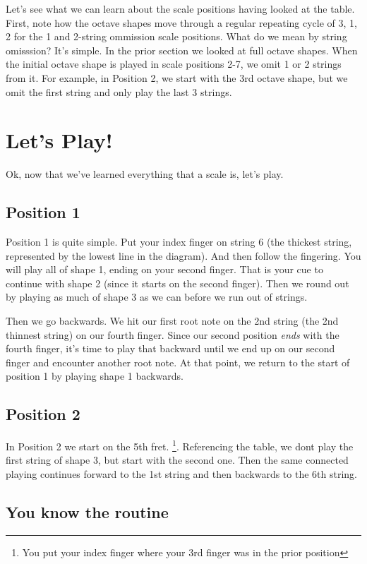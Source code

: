 \documentclass[12pt]{report}
\begin{document}
Let's see what we can learn about the scale positions having looked at
the table. First, note how the octave shapes move through a regular
repeating cycle of 3, 1, 2 for the 1 and 2-string ommission scale
positions. What do we mean by string omisssion? It's simple. In the
prior section we looked at full octave shapes. When the initial octave
shape is played in scale positions 2-7, we omit 1 or 2 strings from
it. For example, in Position 2, we start with the 3rd octave shape,
but we omit the first string and only play the last 3 strings. 

\section{Let's Play!}

Ok, now that we've learned everything that a scale is, let's play.

\subsection{Position 1}

Position 1 is quite simple. Put your index finger on string 6 (the
thickest string, represented by the lowest line in the diagram). And
then follow the fingering. You will play all of shape 1, ending on
your second finger. That is your cue to continue with shape 2 (since
it starts on the second finger). Then we round out by playing as much
of shape 3 as we can before we run out of strings.

Then we go backwards. We hit our first root note on the 2nd string
(the 2nd thinnest string) on our fourth finger. Since our second
position \emph{ends} with the fourth finger, it's time to play that
backward until we end up on our second finger and encounter another
root note. At that point, we return to the start of position 1 by
playing shape 1 backwards.

\subsection {Position 2}

In Position 2 we start on the 5th fret. \footnote{You put your index
  finger where your 3rd finger was in the prior position}. Referencing
the table, we dont play the first string of shape 3, but start with
the second one. Then the same connected playing continues forward to
the 1st string and then backwards to the 6th string.

\subsection {You know the routine}
\end{document}
